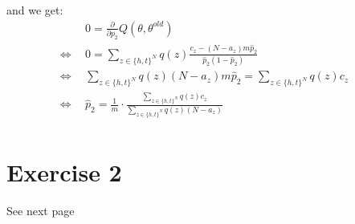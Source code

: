 \documentclass{article}
\begin{document}
and we get:
\begin{align*}
                  &0 =  \frac{\partial}{\partial p_2}Q(\theta,\theta^{old}) &\\
\Leftrightarrow ~~&0 = \sum \limits _{z \in \{h, t\}^N} q(z)  \frac{c_z  - (N - a_z)m \hat{p}_2}{\hat{p}_2(1  - \hat{p}_2)}&\\
\Leftrightarrow ~~&
\sum \limits _{z \in \{h, t\}^N} q(z)(N - a_z)m \hat{p}_2 = \sum \limits _{z \in \{h, t\}^N} q(z)c_z  &\\
\Leftrightarrow ~~&
 \hat{p}_2 =\frac{1}{m} \cdot \frac{\sum \limits _{z \in \{h, t\}^N} q(z)c_z}{\sum \limits _{z \in \{h, t\}^N} q(z)(N - a_z)}  &\\
\end{align*}
\section*{Exercise 2}
See next page
\end{document}
